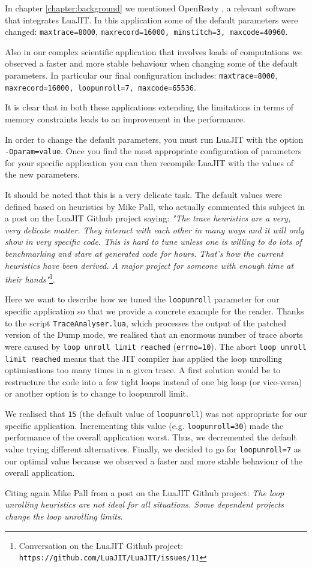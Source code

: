 \noindent
In chapter \ref{chapter:background} we mentioned OpenResty \cite{openresty}, a relevant software that integrates LuaJIT. In this application some of the default parameters were changed: \texttt{maxtrace=8000}, \texttt{maxrecord=16000, \texttt{minstitch=3}, \texttt{maxcode=40960}}.

Also in our complex scientific application that involves loads of computations we observed a faster and more stable behaviour when changing some of the default parameters. In particular our final configuration includes: \texttt{maxtrace=8000}, \texttt{maxrecord=16000, \texttt{loopunroll=7}, \texttt{maxcode=65536}}.

It is clear that in both these applications extending the limitations in terms of memory constraints leads to an improvement in the performance. 

In order to change the default parameters, you must run LuaJIT with the option \texttt{-Oparam=value}. Once you find the most appropriate configuration of parameters for your specific application you can then recompile LuaJIT with the values of the new parameters.

It should be noted that this is a very delicate task. The default values were defined based on heuristics by Mike Pall, who actually commented this subject in a post on the LuaJIT Github project saying: \textit{"The trace heuristics are a very, very delicate matter. They interact with each other in many ways and it will only show in very specific code. This is hard to tune unless one is willing to do lots of benchmarking and stare at generated code for hours. That's how the current heuristics have been derived. A major project for someone with enough time at their hands"}\footnote{\label{note1}Conversation on the LuaJIT Github project: \texttt{https://github.com/LuaJIT/LuaJIT/issues/11}}.

Here we want to describe how we tuned the \texttt{loopunroll} parameter for our specific application so that we provide a concrete example for the reader. Thanks to the script \texttt{TraceAnalyser.lua}, which processes the output of the patched version of the Dump mode, we realised that an enormous number of trace aborts were caused by \texttt{loop unroll limit reached} (\texttt{errno=10}). The abort \texttt{loop unroll limit reached} means that the JIT compiler has applied the loop unrolling optimisations too many times in a given trace. A first solution would be to restructure the code into a few tight loops instead of one big loop (or vice-versa) or another option is to change to loopunroll limit.

We realised that \texttt{15} (the default value of \texttt{loopunroll}) was not appropriate for our specific application. Incrementing this value (e.g. \texttt{loopunroll=30}) made the performance of the overall application worst. Thus, we decremented the default value trying different alternatives. Finally, we decided to go for \texttt{loopunroll=7} as our optimal value because we observed a faster and more stable behaviour of the overall application. 

Citing again Mike Pall from a post on the LuaJIT Github project: 
\textit{The loop unrolling heuristics are not ideal for all situations. Some dependent projects change the loop unrolling limits}\footnotemark[\ref{note1}].